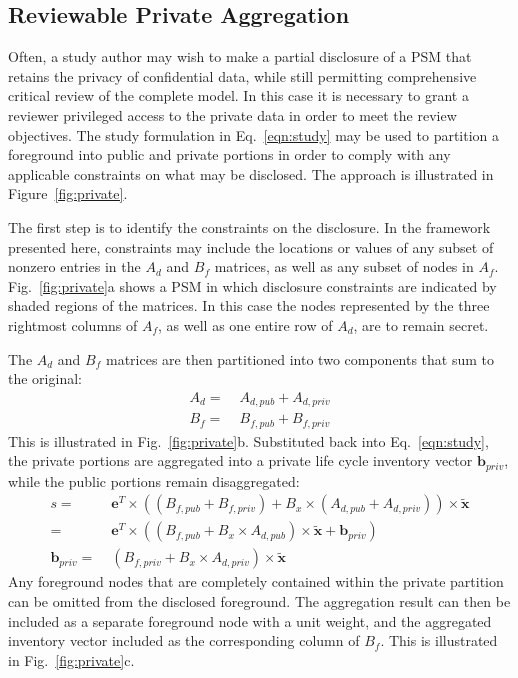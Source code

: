 \subsection{Reviewable Private Aggregation}



Often, a study author may wish to make a partial disclosure of a PSM that retains the privacy of confidential data, while still permitting comprehensive critical review of the complete model.  In this case it is necessary to grant a reviewer privileged access to the private data in order to meet the review objectives.  The study formulation in Eq.~\ref{eqn:study} may be used to partition a foreground into public and private portions in order to comply with any applicable constraints on what may be disclosed.  The approach is illustrated in Figure~\ref{fig:private}.

The first step is to identify the constraints on the disclosure.  In the framework presented here, constraints may include the locations or values of any subset of nonzero entries in the $A_d$ and $B_f$ matrices, as well as any subset of nodes in $A_f$.  Fig.~\ref{fig:private}a shows a PSM in which disclosure constraints are indicated by shaded regions of the matrices.  In this case the nodes represented by the three rightmost columns of $A_f$, as well as one entire row of $A_d$, are to remain secret.

The $A_d$ and $B_f$ matrices are then partitioned into two components that sum to the original:
\begin{equation}\begin{aligned}
  A_d =\; & A_{d,pub} + A_{d,priv} \\
  B_f =\; & B_{f,pub} + B_{f,priv}
  \label{eqn:partition}
  \end{aligned}
  \end{equation}
This is illustrated in Fig.~\ref{fig:private}b.  Substituted back into Eq.~\ref{eqn:study}, the private portions are aggregated into a private life cycle inventory vector $\mathbf{b}_{priv}$, while the public portions remain disaggregated:
\begin{align}
  s =\; & \mathbf{e}^T\times\left((B_{f,pub} + B_{f,priv}) + B_x\times (A_{d,pub} + A_{d,priv})\right)\times\tilde{\mathbf{x}}\\
  =\; & \mathbf{e}^T\times\left((B_{f,pub} + B_x\times A_{d,pub})\times\tilde{\mathbf{x}} + \mathbf{b}_{priv}\right)\\
  \mathbf{b}_{priv} =\; & (B_{f,priv} + B_x\times A_{d,priv})\times \tilde{\mathbf{x}}
\end{align}
Any foreground nodes that are completely contained within the private partition can be omitted from the disclosed foreground.  The aggregation result can then be included as a separate foreground node with a unit weight, and the aggregated inventory vector included as the corresponding column of $B_f$.  This is illustrated in Fig.~\ref{fig:private}c.  



